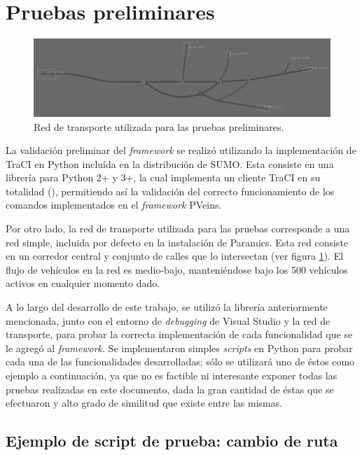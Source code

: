 \section{Pruebas preliminares}

\begin{figure}
    \centering
    \includegraphics[width=\linewidth]{figuras/network8.png}
    \caption{Red de transporte utilizada para las pruebas preliminares.}
    \label{fig:network8}
\end{figure}

La validación preliminar del \emph{framework} se realizó utilizando la implementación de TraCI en Python incluída en la distribución de SUMO. Esta consiste en una librería para Python 2+ y 3+, la cual implementa un cliente TraCI en su totalidad (\autocite{pytraci, pytracisrc}), permitiendo así la validación del correcto funcionamiento de los comandos implementados en el \emph{framework} PVeins.

Por otro lado, la red de transporte utilizada para las pruebas corresponde a una red simple, incluida por defecto en la instalación de Paramics. Esta red consiste en un corredor central y conjunto de calles que lo intersectan (ver figura \ref{fig:network8}). El flujo de vehículos en la red es medio-bajo, manteniéndose bajo los 500 vehículos activos en cualquier momento dado.

A lo largo del desarrollo de este trabajo, se utilizó la librería anteriormente mencionada, junto con el entorno de \emph{debugging} de Visual Studio y la red de transporte, para probar la correcta implementación de cada funcionalidad que se le agregó al \emph{framework}. Se implementaron simples \emph{scripts} en Python para probar cada una de las funcionalidades desarrolladas; sólo se utilizará uno de éstos como ejemplo a continuación, ya que no es factible ni interesante exponer todas las pruebas realizadas en este documento, dada la gran cantidad de éstas que se efectuaron y alto grado de similitud que existe entre las mismas.

\subsection{Ejemplo de script de prueba: cambio de ruta}

